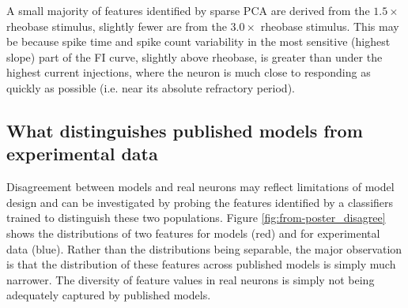 


A small majority of features identified by sparse PCA are derived from the $1.5 \times$ rheobase stimulus, slightly fewer are from the $3.0\times$ rheobase stimulus.
This may be because spike time and spike count variability in the most sensitive (highest slope) part of the FI curve, slightly above rheobase, is greater than under the highest current injections, where the neuron is much close to responding as quickly as possible (i.e. near its absolute refractory period).

\subsection{What distinguishes published models from experimental data}
Disagreement between models and real neurons may reflect limitations of model design and can be investigated by probing the features identified by a classifiers trained to distinguish these two populations. 
Figure \ref{fig:from-poster_disagree} shows the distributions of two features for models (red) and for experimental data (blue).
Rather than the distributions being separable, the major observation is that the distribution of these features across published models is simply much narrower.
The diversity of feature values in real neurons is simply not being adequately captured by published models.

